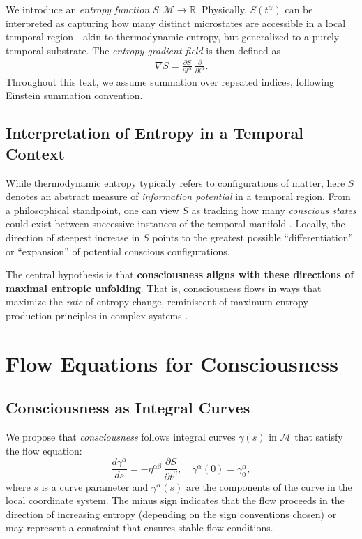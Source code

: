 \documentclass[12pt]{article}
\begin{document}
We introduce an \emph{entropy function} $S: \mathcal{M} \to \mathbb{R}$. Physically, $S(t^\alpha)$ can be interpreted as capturing how many distinct microstates are accessible in a local temporal region---akin to thermodynamic entropy, but generalized to a purely temporal substrate. The \emph{entropy gradient field} is then defined as
\begin{align}
\nabla S 
= \frac{\partial S}{\partial t^\alpha} \,\frac{\partial}{\partial t^\alpha}.
\end{align}
Throughout this text, we assume summation over repeated indices, following Einstein summation convention.

\subsection{Interpretation of Entropy in a Temporal Context}
While thermodynamic entropy typically refers to configurations of matter, here $S$ denotes an abstract measure of \emph{information potential} in a temporal region. From a philosophical standpoint, one can view $S$ as tracking how many \emph{conscious states} could exist between successive instances of the temporal manifold \cite{jaynes1957information}. Locally, the direction of steepest increase in $S$ points to the greatest possible ``differentiation'' or ``expansion'' of potential conscious configurations. 

The central hypothesis is that \textbf{consciousness aligns with these directions of maximal entropic unfolding}. That is, consciousness flows in ways that maximize the \emph{rate} of entropy change, reminiscent of maximum entropy production principles in complex systems \cite{martyushev2006maximum}.

\section{Flow Equations for Consciousness}
\label{sec:flow_equations}

\subsection{Consciousness as Integral Curves}
We propose that \emph{consciousness} follows integral curves $\gamma(s)$ in $\mathcal{M}$ that satisfy the flow equation:
\begin{equation}
\frac{d\gamma^{\alpha}}{ds} 
= 
- \eta^{\alpha \beta} \,\frac{\partial S}{\partial t^{\beta}}, 
\quad
\gamma^\alpha(0) = \gamma^\alpha_0,
\label{eq:gamma_flow}
\end{equation}
where $s$ is a curve parameter and $\gamma^\alpha(s)$ are the components of the curve in the local coordinate system. The minus sign indicates that the flow proceeds in the direction of increasing entropy (depending on the sign conventions chosen) or may represent a constraint that ensures stable flow conditions. 
\end{document}
